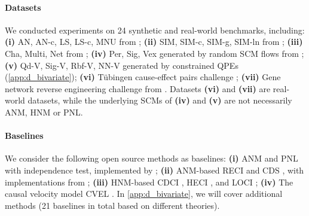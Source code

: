 \documentclass{article}
\theoremstyle{plain}
\theoremstyle{definition}
\theoremstyle{remark}
\begin{document}
\paragraph{Datasets} We conducted experiments on 24 synthetic and real-world benchmarks, including: \textbf{(i)} AN, AN-c, LS, LS-c, MNU from \citep{Tagasovska2020}; \textbf{(ii)} SIM, SIM-c, SIM-g, SIM-ln from \citep{Mooij2016}; \textbf{(iii)} Cha, Multi, Net from \citep{Guyon2019}; \textbf{(iv)} Per, Sig, Vex generated by random SCM flows from \citep{Xi2025}; \textbf{(v)} Qd-V, Sig-V, Rbf-V, NN-V generated by constrained QPEs (\cref{app:d_bivariate}); \textbf{(vi)} Tübingen cause-effect pairs challenge \citep{Mooij2016}; \textbf{(vii)} Gene network reverse engineering challenge from \citep{Marbach2009}. Datasets \textbf{(vi)} and \textbf{(vii)} are real-world datasets, while the underlying SCMs of \textbf{(iv)} and \textbf{(v)} are not necessarily ANM, HNM or PNL.

\paragraph{Baselines} We consider the following open source methods as baselines: \textbf{(i)} ANM and PNL with independence test, implemented by \citep{Zheng2024}; \textbf{(ii)} ANM-based RECI \citep{Bloebaum2018} and CDS \citep{Fonollosa2019}, with implementations from \citep{Kalainathan2020}; \textbf{(iii)} HNM-based CDCI \citep{Duong2022}, HECI \citep{Xu2022}, and LOCI \citep{Immer2023}; \textbf{(iv)} The causal velocity model CVEL \citep{Xi2025}. In \cref{app:d_bivariate}, we will cover additional methods (21 baselines in total based on different theories).
\end{document}

